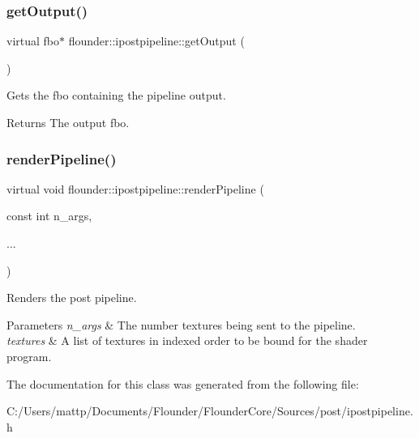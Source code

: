 \subsubsection{\texorpdfstring{get\+Output()}{getOutput()}}
{\footnotesize\ttfamily virtual fbo$\ast$ flounder\+::ipostpipeline\+::get\+Output (\begin{DoxyParamCaption}{ }\end{DoxyParamCaption})\hspace{0.3cm}{\ttfamily [pure virtual]}}



Gets the fbo containing the pipeline output. 

\begin{DoxyReturn}{Returns}
The output fbo. 
\end{DoxyReturn}
\mbox{\label{classflounder_1_1ipostpipeline_a975b354967fa358076d02380feb55265}} 
\subsubsection{\texorpdfstring{render\+Pipeline()}{renderPipeline()}}
{\footnotesize\ttfamily virtual void flounder\+::ipostpipeline\+::render\+Pipeline (\begin{DoxyParamCaption}\item[{const int}]{n\+\_\+args,  }\item[{}]{... }\end{DoxyParamCaption})\hspace{0.3cm}{\ttfamily [pure virtual]}}



Renders the post pipeline. 


\begin{DoxyParams}{Parameters}
{\em n\+\_\+args} & The number textures being sent to the pipeline. \\
\hline
{\em textures} & A list of textures in indexed order to be bound for the shader program. \\
\hline
\end{DoxyParams}


The documentation for this class was generated from the following file\+:\begin{DoxyCompactItemize}
\item 
C\+:/\+Users/mattp/\+Documents/\+Flounder/\+Flounder\+Core/\+Sources/post/ipostpipeline.\+h\end{DoxyCompactItemize}
